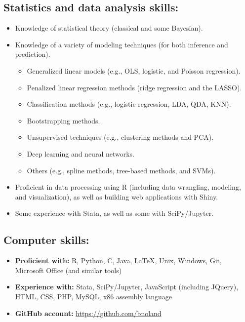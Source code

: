 \documentclass[12pt]{article}
\begin{document}
\subsection*{Statistics and data analysis skills:}
\begin{itemize}
\item
Knowledge of statistical theory (classical and some Bayesian).
\item
Knowledge of a variety of modeling techniques (for both inference and prediction).
\begin{itemize}
\item
Generalized linear models (e.g., OLS, logistic, and Poisson regression).
\item
Penalized linear regression methods (ridge regression and the LASSO).
\item
Classification methods (e.g., logistic regression, LDA, QDA, KNN).
\item
Bootstrapping methods.
\item
Unsupervised techniques (e.g., clustering methods and PCA).
\item
Deep learning and neural networks.
\item
Others (e.g., spline methods, tree-based methods, and SVMs).
\end{itemize}
\item
Proficient in data processing using R (including data wrangling, modeling, and visualization), as 
well as building web applications with Shiny.
\item
Some experience with Stata, as well as some with SciPy/Jupyter.
\end{itemize}

\subsection*{Computer skills:}
\begin{itemize}
\item
\textbf{Proficient with:} R, Python, C, Java, \LaTeX, Unix, Windows, Git, Microsoft Office (and 
similar tools)
\item
\textbf{Experience with:} Stata, SciPy/Jupyter, JavaScript (including JQuery), HTML, CSS, PHP, 
MySQL, x86 assembly language
\item
\textbf{GitHub account:} \url{https://github.com/bnoland}
\end{itemize}
\end{document}
